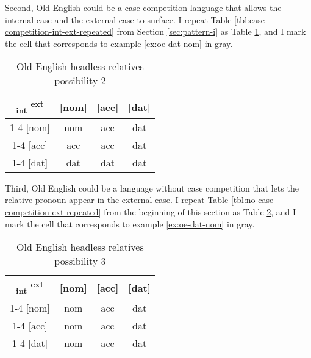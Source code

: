 Second, Old English could be a case competition language that allows the internal case and the external case to surface. I repeat Table \ref{tbl:case-competition-int-ext-repeated} from Section \ref{sec:pattern-i} as Table \ref{tbl:oe-poss2}, and I mark the cell that corresponds to example \ref{ex:oe-dat-nom} in gray.

  \begin{table}[H]
    \center
    \caption{Old English headless relatives possibility 2}
    \begin{tabular}{c|c|c|c}
      \toprule
      \textsubscript{\ac{int}} \textsuperscript{\ac{ext}}
             & [\ac{nom}]
             & [\ac{acc}]
             & [\ac{dat}]
             \\ \cmidrule{1-4}
         [\ac{nom}]
             & \ac{nom}
             & \ac{acc}
             & \cellcolor{LG}\ac{dat}
             \\ \cmidrule{1-4}
         [\ac{acc}]
             & \ac{acc}
             & \ac{acc}
             & \ac{dat}
             \\ \cmidrule{1-4}
         [\ac{dat}]
             & \ac{dat}
             & \ac{dat}
             & \ac{dat}
             \\
       \bottomrule
    \end{tabular}
      \label{tbl:oe-poss2}
  \end{table}

Third, Old English could be a language without case competition that lets the relative pronoun appear in the external case. I repeat Table \ref{tbl:no-case-competition-ext-repeated} from the beginning of this section as Table \ref{tbl:oe-poss3}, and I mark the cell that corresponds to example \ref{ex:oe-dat-nom} in gray.

 \begin{table}[H]
   \center
   \caption{Old English headless relatives possibility 3}
   \begin{tabular}{c|c|c|c}
     \toprule
    \textsubscript{\ac{int}} \textsuperscript{\ac{ext}}
           & [\ac{nom}]
           & [\ac{acc}]
           & [\ac{dat}]
           \\ \cmidrule{1-4}
       [\ac{nom}]
           & \ac{nom}
           & \ac{acc}
           & \cellcolor{LG}\ac{dat}
           \\ \cmidrule{1-4}
       [\ac{acc}]
           & \ac{nom}
           & \ac{acc}
           & \ac{dat}
           \\ \cmidrule{1-4}
       [\ac{dat}]
           & \ac{nom}
           & \ac{acc}
           & \ac{dat}
           \\
     \bottomrule
   \end{tabular}
   \label{tbl:oe-poss3}
 \end{table}

